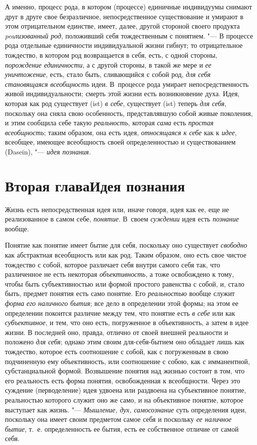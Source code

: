 {{А именно, процесс рода, в котором (процессе) единичные
индивидуумы снимают друг в друге свое безразличное, непосредственное
существование и умирают в этом отрицательном единстве, имеет, далее, другой
стороной своего продукта
{\em peaлизованный род},
положивший себя тождественным с понятием. "--- В
процессе рода отдельные единичности индивидуальной жизни гибнут; то
отрицательное тождество, в котором род возвращается в себя, есть, с одной
стороны, {\em порождение единичности},
а с другой стороны, в такой же мере и
{\em ее уничтожение},
есть, стало быть, сливающийся с собой род,
{\em для себя становящаяся всеобщность}
идеи. В~процессе рода умирает непосредственность живой
индивидуальности; смерть этой жизни есть возникновение духа. Идея, которая
как род существует (ist) {\em в себе},
существует (ist) теперь
{\em для себя}, поскольку
она сняла свою особенность, представлявшую собой живые поколения, и этим
сообщила себе такую {\em реальность},
которая {\em сама}
есть {\em простая
всеобщность}; таким образом, она есть идея,
{\em относящаяся к себе}
как к {\em идее},
всеобщее, имеющее всеобщность своей определенностью и
существованием (Dasein), "--- {\em идея
познания}.

\chapter[Вторая глава Идея познания]{Вторая глава\newline Идея познания}
Жизнь есть непосредственная идея или, иначе говоря, идея как
ее, еще не реализованное в самом себе,
{\em понятие}. В~своем
{\em суждении} идея есть
{\em познание} вообще.

Понятие как понятие имеет бытие для себя, поскольку оно
существует {\em свободно}
как абстрактная всеобщность или как род. Таким образом, оно
есть свое чистое тождество с собой, которое различает себя внутри самого
себя так, что различенное не есть некоторая
{\em объективность}, а
тоже освобождено к тому, чтобы быть субъективностью или формой простого
равенства с собой, и, стало быть, предмет понятия есть само понятие. Его
{\em реальностью} вообще
служит {\em форма}
{\em его наличного бытия};
все дело в определении этой формы; на этом ее определении
покоится различие между тем, что понятие есть
{\em в себе} или как
{\em субъективное}, и
тем, что оно есть, погруженное в объективность, а затем в идее жизни. В
последней оно, правда, отлично от своей внешней реальности и положено
{\em для себя}; однако
этим своим для-себя-бытием оно обладает лишь как тождество, которое есть
соотношение с собой, как с погруженным в свою подчиненную ему
объективность, или соотношение с собою, как с имманентной, субстанциальной
формой. Возвышение понятия над жизнью состоит в том, что его реальность
есть форма понятия, освобожденная к всеобщности. Через это суждение
(перводеление) идея удвоена или раздвоена на субъективное понятие,
реальностью которого служит оно же само, и на объективное понятие, которое
выступает как жизнь. "--- {\em Мышление,
дух, самосознание} суть определения идеи, поскольку она
имеет своим предметом самое себя и поскольку
{\em ее наличное бытие},
т.~е. определенность ее бытия, есть ее собственное отличие от
самой себя.

}}
